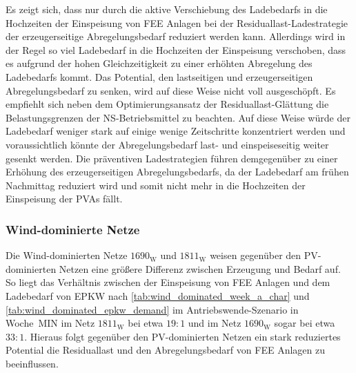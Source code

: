 Es zeigt sich, dass nur durch die aktive Verschiebung des Ladebedarfs in die Hochzeiten der Einspeisung von \gls{FEE} Anlagen bei der Residuallast-Ladestrategie der erzeugerseitige Abregelungsbedarf reduziert werden kann.
Allerdings wird in der Regel so viel Ladebedarf in die Hochzeiten der Einspeisung verschoben, dass es aufgrund der hohen Gleichzeitigkeit zu einer erhöhten Abregelung des Ladebedarfs kommt.
Das Potential, den lastseitigen und erzeugerseitigen Abregelungsbedarf zu senken, wird auf diese Weise nicht voll ausgeschöpft.
Es empfiehlt sich neben dem Optimierungsansatz der Residuallast-Glättung die Belastungsgrenzen der \gls{NS}-Betriebsmittel zu beachten.
Auf diese Weise würde der Ladebedarf weniger stark auf einige wenige Zeitschritte konzentriert werden und voraussichtlich könnte der Abregelungsbedarf last- und einspeiseseitig weiter gesenkt werden.
Die präventiven Ladestrategien führen demgegenüber zu einer Erhöhung des erzeugerseitigen Abregelungsbedarfs, da der Ladebedarf am frühen Nachmittag reduziert wird und somit nicht mehr in die Hochzeiten der Einspeisung der \glspl{PVA} fällt.


\subsubsection{Wind-dominierte Netze}\label{chap:wind_cur_results}

Die Wind-dominierten Netze \(1690_{\text{W}}\) und \(1811_{\text{W}}\) weisen gegenüber den \gls{PV}-dominierten Netzen eine größere Differenz zwischen Erzeugung und Bedarf auf.
So liegt das Verhältnis zwischen der Einspeisung von \gls{FEE} Anlagen und dem Ladebedarf von \gls{EPKW} nach \autoref{tab:wind_dominated_week_a_char} und \autoref{tab:wind_dominated_epkw_demand} im Antriebswende-Szenario in Woche~MIN im Netz \(1811_{\text{W}}\) bei etwa \(19:1\) und im Netz \(1690_{\text{W}}\) sogar bei etwa \(33:1\).
Hieraus folgt gegenüber den \gls{PV}-dominierten Netzen ein stark reduziertes Potential die Residuallast und den Abregelungsbedarf von \gls{FEE} Anlagen zu beeinflussen.





